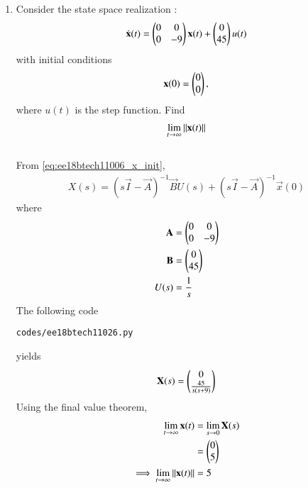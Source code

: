 \begin{enumerate}[label=\thesubsection.\arabic*.,ref=\thesubsection.\theenumi]

\item
Consider the state space realization : 
\begin{align}
  \dot{ \mathbf{x}}(t)=\begin{pmatrix}0&0\\0&-9\end{pmatrix}\mathbf{x}(t) + \begin{pmatrix}0\\45\end{pmatrix}u(t)   
\end{align}
with initial conditions 
\begin{align}
\mathbf{x}(0) = \begin{pmatrix}0\\0\end{pmatrix},
\end{align}
 where $u(t)$ is the step function.  Find 
\begin{align}
\lim _ {t \to \infty}\left\lVert\mathbf{x}(t)\right\rVert
\end{align}
\\
\solution
From \eqref{eq:ee18btech11006_x_init},
\begin{align}
     X(s)={(s\vec{I}-\vec{A})^{-1}}\vec{B} U(s)+ (s\vec{I}-\vec{A})^{-1}\vec{x}(0)
\end{align}
where
\begin{align}
     \mathbf{A} &=    \begin{pmatrix}0&0\\0&-9\end{pmatrix}\\
     \mathbf{B} &=    \begin{pmatrix}0 \\ 45\end{pmatrix}\\
U(s) &= \frac{1}{s}
\end{align}
%
The following code 
\begin{lstlisting}
codes/ee18btech11026.py
\end{lstlisting}
yields 
%
\begin{align}
   \mathbf{X}(s) = \begin{pmatrix}0\\\frac{45}{s(s+9)}\end{pmatrix}    
\end{align}
Using the final value theorem,  
\begin{align}
\lim _ {t \to \infty}\mathbf{x}(t) &= \lim _ {s \to 0}\mathbf{X}(s) 
\\
&= \begin{pmatrix}0\\5\end{pmatrix} 
\\
\implies \lim _ {t \to \infty}\left\lVert\mathbf{x}(t)\right\rVert &= 5
\end{align}


\end{enumerate}
